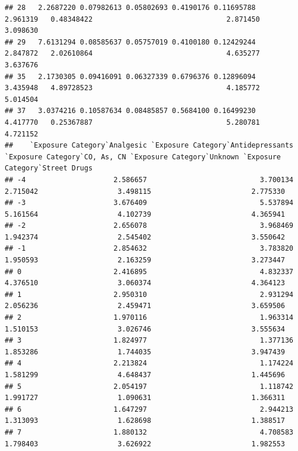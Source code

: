 \documentclass[
]{article}
\begin{document}
\begin{verbatim}
## 28   2.2687220 0.07982613 0.05802693 0.4190176 0.11695788                       2.961319   0.48348422                                2.871450       3.098630
## 29   7.6131294 0.08585637 0.05757019 0.4100180 0.12429244                       2.847872   2.02610864                                4.635277       3.637676
## 35   2.1730305 0.09416091 0.06327339 0.6796376 0.12896094                       3.435948   4.89728523                                4.185772       5.014504
## 37   3.0374216 0.10587634 0.08485857 0.5684100 0.16499230                       4.417770   0.25367887                                5.280781       4.721152
##    `Exposure Category`Analgesic `Exposure Category`Antidepressants `Exposure Category`CO, As, CN `Exposure Category`Unknown `Exposure Category`Street Drugs
## -4                     2.586657                           3.700134                      2.715042                   3.498115                        2.775330
## -3                     3.676409                           5.537894                      5.161564                   4.102739                        4.365941
## -2                     2.656078                           3.968469                      1.942374                   2.545402                        3.550642
## -1                     2.854632                           3.783820                      1.950593                   2.163259                        3.273447
## 0                      2.416895                           4.832337                      4.376510                   3.060374                        4.364123
## 1                      2.950310                           2.931294                      2.056236                   2.459471                        3.659506
## 2                      1.970116                           1.963314                      1.510153                   3.026746                        3.555634
## 3                      1.824977                           1.377136                      1.853286                   1.744035                        3.947439
## 4                      2.213824                           1.174224                      1.581299                   4.648437                        1.445696
## 5                      2.054197                           1.118742                      1.991727                   1.090631                        1.366311
## 6                      1.647297                           2.944213                      1.313093                   1.628698                        1.388517
## 7                      1.880132                           4.708583                      1.798403                   3.626922                        1.982553

\end{verbatim}
\end{document}

